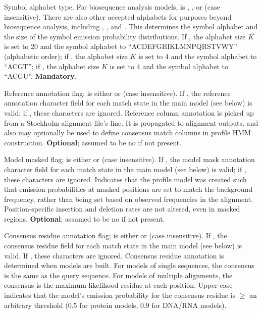 \begin{sreitems}{}
\item [\monob{ALPH <s>}] Symbol alphabet type. For biosequence
analysis models,  is , , or 
(case insensitive). There are also other accepted alphabets for
purposes beyond biosequence analysis, including ,
, and . This determines the symbol alphabet
and the size of the symbol emission probability distributions.  If
, the alphabet size $K$ is set to 20 and the symbol
alphabet to ``ACDEFGHIKLMNPQRSTVWY'' (alphabetic order); if
, the alphabet size $K$ is set to 4 and the symbol alphabet
to ``ACGT''; if , the alphabet size $K$ is set to 4 and the
symbol alphabet to ``ACGU''. \textbf{Mandatory.}

\item [\monob{RF <s>}] Reference annotation flag;  is
either  or  (case insensitive). If , the
reference annotation character field for each match state in the main
model (see below) is valid; if , these characters are
ignored.  Reference column annotation is picked up from a Stockholm
alignment file's  line. It is propagated to alignment
outputs, and also may optionally be used to define consensus match
columns in profile HMM construction. \textbf{Optional}; assumed to be
no if not present.

\item [\monob{MM <s>}] Model masked flag;  is
either  or  (case insensitive). If , the
model mask annotation character field for each match state in the main
model (see below) is valid; if , these characters are
ignored. Indicates that the profile model was created such that
emission probabilities at masked positions are set to match the 
background frequency, rather than being set based on observed frequencies 
in the alignment. Position-specific insertion and deletion rates are not 
altered, even in masked regions. \textbf{Optional}; assumed to be
no if not present.

\item [\monob{CONS <s>}] Consensus residue annotation flag;
   is either  or  (case insensitive).  If
  , the consensus residue field for each match state in the
  main model (see below) is valid. If , these characters are
  ignored. Consensus residue annotation is determined when models are
  built. For models of single sequences, the consensus is the same as
  the query sequence. For models of multiple alignments, the consensus
  is the maximum likelihood residue at each position. Upper case
  indicates that the model's emission probability for the consensus
  residue is $\geq$ an arbitrary threshold (0.5 for protein models,
  0.9 for DNA/RNA models).


\end{sreitems}
